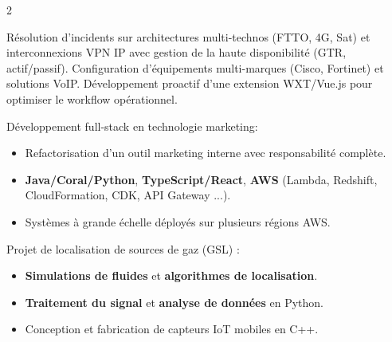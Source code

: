 \documentclass[10pt,a4paper,ragged2e,withhyper]{../AltaCV/altacv}
\begin{document}



\makecvheader


\begin{paracol}{2}


  Résolution d'incidents sur architectures multi-technos (FTTO, 4G, Sat) et interconnexions VPN IP avec gestion de la haute disponibilité (GTR, actif/passif).
  Configuration d'équipements multi-marques (Cisco, Fortinet) et solutions VoIP.
  Développement proactif d’une extension WXT/Vue.js pour optimiser le workflow opérationnel.

  \divider

  Développement full-stack en technologie marketing:

  \begin{itemize}
    \item Refactorisation d'un outil marketing interne avec responsabilité complète.
    \item \textbf{Java/Coral/Python}, \textbf{TypeScript/React}, \textbf{AWS} (Lambda, Redshift, CloudFormation, CDK, API Gateway ...).
    \item Systèmes à grande échelle déployés sur plusieurs régions AWS.
  \end{itemize}

  \divider

  Projet de localisation de sources de gaz (GSL) :
  \begin{itemize}
    \item \textbf{Simulations de fluides} et \textbf{algorithmes de localisation}.
    \item \textbf{Traitement du signal} et \textbf{analyse de données} en Python.
    \item Conception et fabrication de capteurs IoT mobiles en C++.
  \end{itemize}


\end{paracol}
\end{document}
